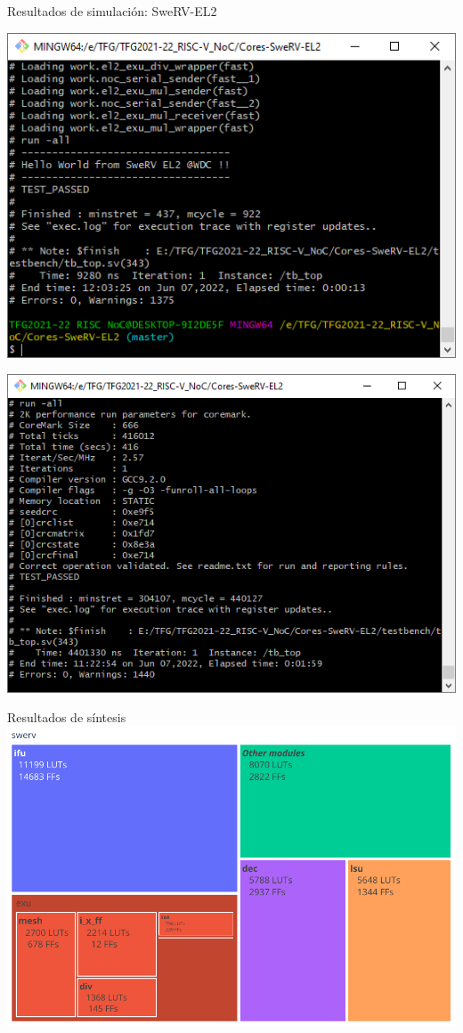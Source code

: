 \begin{frame}{Resultados de simulación: SweRV-EL2}
    \begin{minipage}{.5\textwidth}
        \centering
        \includegraphics[width=.95\linewidth]{Images/captura_hello_world.PNG}
    \end{minipage}\begin{minipage}{.5\textwidth}
        \centering
        \includegraphics[width=.95\linewidth]{Images/captura_coremark.PNG}
    \end{minipage}
\end{frame}

\begin{frame}{Resultados de síntesis}
    \centering
    \includegraphics[height=.9\textheight]{Images/swerv_treemap.pdf}
\end{frame}